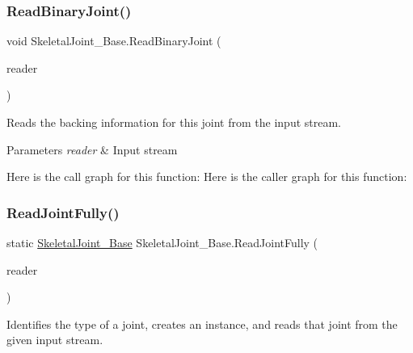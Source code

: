 \mbox{\label{class_skeletal_joint___base_a7f71e5afc3b791ffed1bd040425737ef}} 
\subsubsection{\texorpdfstring{Read\+Binary\+Joint()}{ReadBinaryJoint()}}
{\footnotesize\ttfamily void Skeletal\+Joint\+\_\+\+Base.\+Read\+Binary\+Joint (\begin{DoxyParamCaption}\item[{System.\+I\+O.\+Binary\+Reader}]{reader }\end{DoxyParamCaption})}



Reads the backing information for this joint from the input stream. 


\begin{DoxyParams}{Parameters}
{\em reader} & Input stream\\
\hline
\end{DoxyParams}
Here is the call graph for this function\+:
Here is the caller graph for this function\+:
\mbox{\label{class_skeletal_joint___base_ae9f8e31a56644eb92cb901a4587a3d24}} 
\subsubsection{\texorpdfstring{Read\+Joint\+Fully()}{ReadJointFully()}}
{\footnotesize\ttfamily static \hyperlink{class_skeletal_joint___base}{Skeletal\+Joint\+\_\+\+Base} Skeletal\+Joint\+\_\+\+Base.\+Read\+Joint\+Fully (\begin{DoxyParamCaption}\item[{System.\+I\+O.\+Binary\+Reader}]{reader }\end{DoxyParamCaption})\hspace{0.3cm}{\ttfamily [static]}}



Identifies the type of a joint, creates an instance, and reads that joint from the given input stream. 


